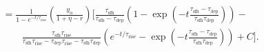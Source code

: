 \documentclass[12pt]{article}
\newcommand{\timescale}[1]{\ensuremath{\tau_\text{#1}}}
\begin{document}
\begin{subequations}
\begin{align}
\begin{split} %
&= \frac{1}{1 - e^{-t / \timescale{rise}}}
\left(\frac{y_\alpha}{1 + \eta - r}\right)
\bigg[\frac{
	\timescale{sfh}
}{
	\timescale{sfh} - \timescale{dep}
} \left(
1 - \exp\left(-t\frac{
	\timescale{sfh} - \timescale{dep}
}{
	\timescale{sfh}\timescale{dep}
}\right)
\right) -
\\
&\qquad \frac{
	\timescale{sfh}\timescale{rise}
}{
	\timescale{sfh}\timescale{rise} - \timescale{dep}\timescale{rise} -
	\timescale{sfh}\timescale{dep}
} \left(e^{-t / \timescale{rise}} -
\exp\left(-t
\frac{
	\timescale{sfh} - \timescale{dep}
}{
	\timescale{sfh}\timescale{dep}
}
\right)
\right) + C\bigg].
\end{split}
\label{eq:zalpha-full}
\end{align}\end{subequations}
\end{document}
